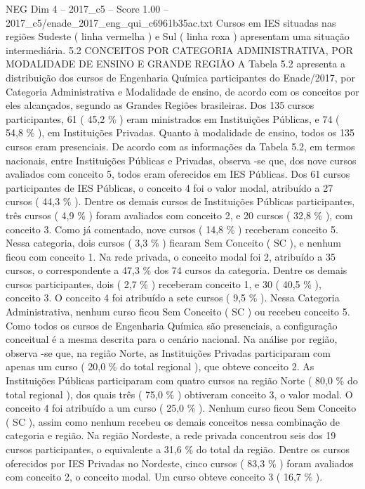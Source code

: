 \begin{textsample}{NEG Dim 4 – 2017\_c5 – Score 1.00 – 2017\_c5/enade\_2017\_eng\_qui\_c6961b35ac.txt}
Cursos em IES situadas nas regiões Sudeste ( linha vermelha ) e Sul ( linha roxa ) apresentam uma situação intermediária. 5.2 CONCEITOS POR CATEGORIA ADMINISTRATIVA, POR MODALIDADE DE ENSINO E GRANDE REGIÃO A Tabela 5.2 apresenta a distribuição dos cursos de Engenharia Química participantes do Enade/2017, por Categoria Administrativa e Modalidade de ensino, de acordo com os conceitos por eles alcançados, segundo as Grandes Regiões brasileiras.
Dos 135 cursos participantes, 61 ( 45,2 \% ) eram ministrados em Instituições Públicas, e 74 ( 54,8 \% ), em Instituições Privadas.
Quanto à modalidade de ensino, todos os 135 cursos eram presenciais.
De acordo com as informações da Tabela 5.2, em termos nacionais, entre Instituições Públicas e Privadas, observa -se que, dos nove cursos avaliados com conceito 5, todos eram oferecidos em IES Públicas.
Dos 61 cursos participantes de IES Públicas, o conceito 4 foi o valor modal, atribuído a 27 cursos ( 44,3 \% ).
Dentre os demais cursos de Instituições Públicas participantes, três cursos ( 4,9 \% ) foram avaliados com conceito 2, e 20 cursos ( 32,8 \% ), com conceito 3.
Como já comentado, nove cursos ( 14,8 \% ) receberam conceito 5.
Nessa categoria, dois cursos ( 3,3 \% ) ficaram Sem Conceito ( SC ), e nenhum ficou com conceito 1.
Na rede privada, o conceito modal foi 2, atribuído a 35 cursos, o correspondente a 47,3 \% dos 74 cursos da categoria.
Dentre os demais cursos participantes, dois ( 2,7 \% ) receberam conceito 1, e 30 ( 40,5 \% ), conceito 3.
O conceito 4 foi atribuído a sete cursos ( 9,5 \% ).
Nessa Categoria Administrativa, nenhum curso ficou Sem Conceito ( SC ) ou recebeu conceito 5.
Como todos os cursos de Engenharia Química são presenciais, a configuração conceitual é a mesma descrita para o cenário nacional.
Na análise por região, observa -se que, na região Norte, as Instituições Privadas participaram com apenas um curso ( 20,0 \% do total regional ), que obteve conceito 2.
As Instituições Públicas participaram com quatro cursos na região Norte ( 80,0 \% do total regional ), dos quais três ( 75,0 \% ) obtiveram conceito 3, o valor modal.
O conceito 4 foi atribuído a um curso ( 25,0 \% ).
Nenhum curso ficou Sem Conceito ( SC ), assim como nenhum recebeu os demais conceitos nessa combinação de categoria e região.
Na região Nordeste, a rede privada concentrou seis dos 19 cursos participantes, o equivalente a 31,6 \% do total da região.
Dentre os cursos oferecidos por IES Privadas no Nordeste, cinco cursos ( 83,3 \% ) foram avaliados com conceito 2, o conceito modal.
Um curso obteve conceito 3 ( 16,7 \% ).

\end{textsample}
